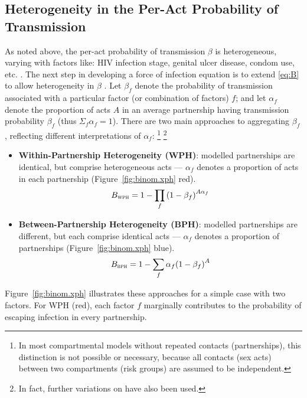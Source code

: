 \subsection{Heterogeneity in the Per-Act Probability of Transmission}\label{foi.prior.xph}
As noted above, the per-act probability of transmission $\beta$ is heterogeneous,
varying with factors like: HIV infection stage, genital ulcer disease, condom use, etc.
\cite{Boily2009,Giannou2016}.
The next step in developing a force of infection equation is to extend \eqref{eq:B}
to allow heterogeneity in $\beta$ \cite{Allard1990}.
Let $\beta_f$ denote the probability of transmission associated
with a particular factor (or combination of factors) $f$; and
let $\alpha_f$ denote the proportion of acts $A$ in an average partnership
having transmission probability $\beta_f$
(thus $\Sigma_f \alpha_f = 1$).
There are two main approaches to aggregating $\beta_f$,
reflecting different interpretations of $\alpha_f$:%
\footnote{In most compartmental models without repeated contacts (partnerships),
  this distinction is not possible or necessary, because
  all contacts (sex acts) between two compartments (risk groups) are assumed to be independent.}
\footnote{In fact, further variations on  have also been used.}
\begin{itemize}
  \item \textbf{{Within}-Partnership Heterogeneity (WPH)}:
  modelled partnerships are identical, but comprise heterogeneous acts
  --- $\alpha_f$ denotes a proportion of acts in each partnership
  (Figure~\ref{fig:binom.xph} red).
  \begin{equation}\label{eq:B.wph}
    B_{\textsc{wph}} = 1 - \prod_f {(1 - \beta_f)}^{A\alpha_f}
  \end{equation}
  \item \textbf{{Between}-Partnership Heterogeneity (BPH)}:
  modelled partnerships are different, but each comprise identical acts
  --- $\alpha_f$ denotes a proportion of partnerships
  (Figure~\ref{fig:binom.xph} blue).
  \begin{equation}\label{eq:B.bph}
    B_{\textsc{bph}} = 1 - \sum_f \alpha_f {(1 - \beta_f)}^{A}
  \end{equation}
\end{itemize}
Figure~\ref{fig:binom.xph} illustrates these approaches for a simple case with two factors.
For WPH (red), each factor $f$ marginally contributes to
the probability of escaping infection in every partnership.
